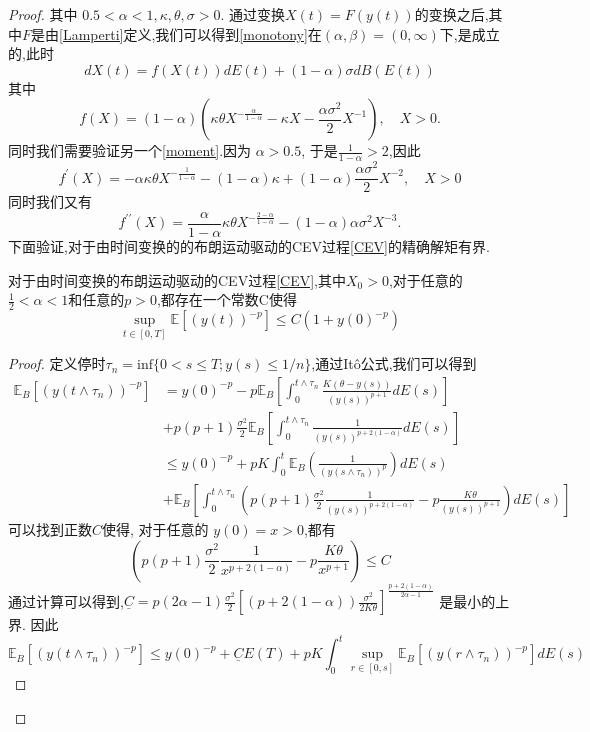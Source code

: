 \begin{proof}
	其中 $0.5<\alpha<1,\kappa,\theta,\sigma>0.$ 通过变换$X(t)=F(y(t))$的变换之后,其中$F$是由\cref{Lamperti}定义,我们可以得到\cref{monotony}在$(\alpha,\beta)=(0,\infty)$下,是成立的,此时	$$dX(t)=f(X(t))dE(t)+(1-\alpha)\sigma dB(E(t))$$
	其中
	$$f(X)=(1-\alpha)\left(\kappa\theta X^{-\frac\alpha{1-\alpha}}-\kappa X-\frac{\alpha\sigma^2}2X^{-1}\right),\quad X>0.$$
	同时我们需要验证另一个\cref{moment}.因为 $\alpha>0.5$, 于是$\frac{1}{1-\alpha}>2$,因此
	$$f^{\prime}(X)=-\alpha\kappa\theta X^{-\frac1{1-\alpha}}-(1-\alpha)\kappa+(1-\alpha)\frac{\alpha\sigma^2}2X^{-2},\quad X>0$$
	同时我们又有
	$$f^{\prime\prime}(X)=\frac\alpha{1-\alpha}\kappa\theta X^{-\frac{2-\alpha}{1-\alpha}}-(1-\alpha)\alpha\sigma^2X^{-3}.$$
	下面验证,对于由时间变换的的布朗运动驱动的CEV过程\cref{CEV}的精确解矩有界.
	\begin{proposition}
		对于由时间变换的布朗运动驱动的CEV过程\cref{CEV},其中$X_0>0$,对于任意的$\frac{1}{2}<\alpha<1$和任意的$p>0$,都存在一个常数C使得
		\begin{equation*}
			\sup\limits_{t\in[0,T]}\mathbb{E}\left[\left(y(t)\right)^{-p}\right]\leq C(1+y(0)^{-p})
		\end{equation*}
	\end{proposition}
	\begin{proof}
		定义停时$\tau_{n}=\mathrm{inf}\{0<s\leq T;y(s)\leq1/n\}$,通过It\^{o}公式,我们可以得到
		$$\begin{aligned}
			\mathbb{E}_B\left[(y(t\wedge\tau_{n}))^{-p}\right] &=y(0)^{-p}-p\mathbb{E}_B\left[\int_{0}^{t\wedge\tau_{n}}\frac{K(\theta-y(s))}{(y(s))^{p+1}}dE(s)\right]\\
			&+p(p+1)\frac{\sigma^{2}}{2}\mathbb{E}_B\left[\int_{0}^{t\wedge\tau_{n}}\frac{1}{(y(s))^{p+2(1-\alpha)}}dE(s)\right] \\
			&\leq y(0)^{-p}+pK\int_{0}^{t}\mathbb{E}_B\left(\frac{1}{(y(s\wedge\tau_{n}))^{p}}
			\right)dE(s) \\
			&+\mathbb{E}_B\left[\int_0^{t\wedge\tau_n}\left(p(p+1)\frac{\sigma^2}{2}\frac{1}{(y(s))^{p+2(1-\alpha)}}-p\frac{K\theta}{(y(s))^{p+1}}\right)dE(s)\right]
		\end{aligned}$$
		可以找到正数$C$使得, 对于任意的 $y(0)=x>0$,都有
		$$\left(p(p+1)\frac{\sigma^2}{2}\frac{1}{x^{p+2(1-\alpha)}}-p\frac{K\theta}{x^{p+1}}\right)\leq C$$
		通过计算可以得到,$\underline C=p(2\alpha-1)\frac{\sigma^2}{2}\left[(p+2(1-\alpha))\frac{\sigma^2}{2K\theta}\right]^{\frac{p+2(1-\alpha)}{2\alpha-1}}$ 是最小的上界. 因此
		$$\mathbb{E}_B\left[(y(t\wedge\tau_n))^{-p}\right]\leq y(0)^{-p}+\underline{C}E(T)+pK\int_0^t\sup_{r\in[0,s]}\mathbb{E}_B\left[(y(r\wedge\tau_n))^{-p}\right]dE(s)$$

\end{proof}
\end{proof}

